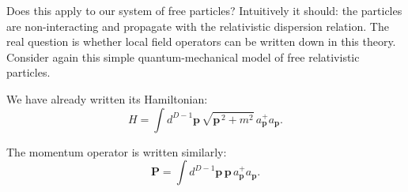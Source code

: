 Does this apply to our system of free particles? Intuitively it should: the
particles are non-interacting and propagate with the relativistic dispersion
relation. The real question is whether local field operators can be written down
in this theory.
Consider again this simple quantum-mechanical model of free relativistic
particles.

We have already written its Hamiltonian:
\begin{equation}
  H=\int d^{D-1}\mathbf p\,
  \sqrt{\mathbf p^{\,2}+m^2}\,
  a_{\mathbf p}^{+}a_{\mathbf p}.
  \label{eq:253a-free-hamiltonian-recalled}
\end{equation}

The momentum operator is written similarly:
\begin{equation}
  \mathbf P=\int d^{D-1}\mathbf p\,\mathbf p\,a_{\mathbf p}^{+}a_{\mathbf p}.
  \label{eq:253a-free-momentum-generator}
\end{equation}

